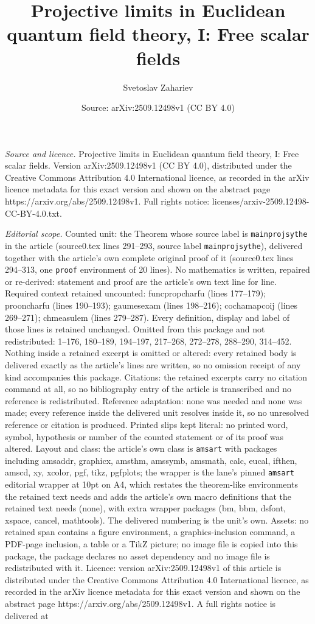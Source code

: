 \documentclass[10pt,a4paper]{amsart}
\title[Projective limits in Euclidean quantum field theory, I: Free]{Projective limits in Euclidean quantum field theory, I: Free scalar fields}
\author{Svetoslav Zahariev}
\date{Source: arXiv:2509.12498v1 (CC BY 4.0)}
\begin{document}
\maketitle

\noindent\emph{Source and licence.} Projective limits in Euclidean quantum field theory, I: Free scalar fields. Version arXiv:2509.12498v1 (CC BY 4.0), distributed under the Creative Commons Attribution 4.0 International licence, as recorded in the arXiv licence metadata for this exact version and shown on the abstract page https://arxiv.org/abs/2509.12498v1. Full rights notice: licenses/arxiv-2509.12498-CC-BY-4.0.txt.\par\smallskip

\noindent\textit{Editorial scope.} Counted unit: the Theorem whose source label is \texttt{mainprojsythe} in the article (source0.tex lines 291--293, source label \texttt{mainprojsythe}), delivered together with the article's own complete original proof of it (source0.tex lines 294--313, one \texttt{proof} environment of 20 lines). No mathematics is written, repaired or re-derived: statement and proof are the article's own text line for line. Required context retained uncounted: funcpropcharfu (lines 177--179); prooncharfu (lines 190--193); gaumesexam (lines 198--216); cochamapcoij (lines 269--271); chmeasulem (lines 279--287). Every definition, display and label of those lines is retained unchanged. Omitted from this package and not redistributed: 1--176, 180--189, 194--197, 217--268, 272--278, 288--290, 314--452. Nothing inside a retained excerpt is omitted or altered: every retained body is delivered exactly as the article's lines are written, so no omission receipt of any kind accompanies this package. Citations: the retained excerpts carry no citation command at all, so no bibliography entry of the article is transcribed and no reference is redistributed. Reference adaptation: none was needed and none was made; every reference inside the delivered unit resolves inside it, so no unresolved reference or citation is produced. Printed slips kept literal: no printed word, symbol, hypothesis or number of the counted statement or of its proof was altered. Layout and class: the article's own class is \texttt{amsart} with packages including amsaddr, graphicx, amsthm, amssymb, amsmath, calc, eucal, ifthen, amscd, xy, xcolor, pgf, tikz, pgfplots; the wrapper is the lane's pinned \texttt{amsart} editorial wrapper at 10pt on A4, which restates the theorem-like environments the retained text needs and adds the article's own macro definitions that the retained text needs (none), with extra wrapper packages (bm, bbm, dsfont, xspace, cancel, mathtools). The delivered numbering is the unit's own. Assets: no retained span contains a figure environment, a graphics-inclusion command, a PDF-page inclusion, a table or a TikZ picture; no image file is copied into this package, the package declares no asset dependency and no image file is redistributed with it. Licence: version arXiv:2509.12498v1 of this article is distributed under the Creative Commons Attribution 4.0 International licence, as recorded in the arXiv licence metadata for this exact version and shown on the abstract page https://arxiv.org/abs/2509.12498v1. A full rights notice is delivered at 
\end{document}
